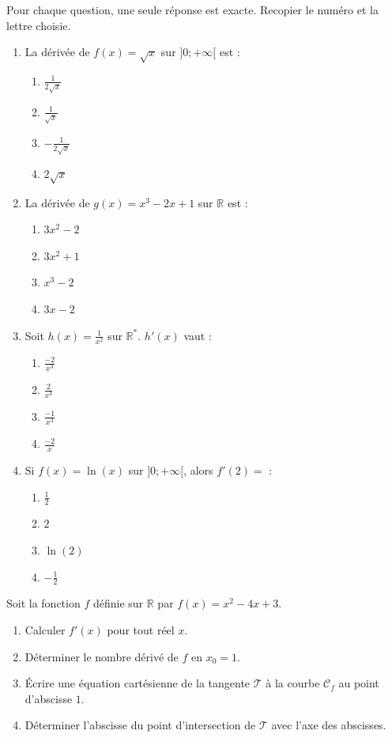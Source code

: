 \documentclass[11pt]{article}
\begin{document}
\begin{exercice}
Pour chaque question, une seule réponse est exacte. Recopier le numéro et la lettre choisie.
\begin{enumerate}
    \item La dérivée de $f(x) = \sqrt{x}$ sur $]0;+\infty[$ est :
    \begin{enumerate}
        \item $\frac{1}{2\sqrt{x}}$ \item $\frac{1}{\sqrt{x}}$ \item $-\frac{1}{2\sqrt{x}}$ \item $2\sqrt{x}$
    \end{enumerate}
    \item La dérivée de $g(x) = x^3 - 2x + 1$ sur $\mathbb{R}$ est :
    \begin{enumerate}
        \item $3x^2 - 2$ \item $3x^2 + 1$ \item $x^3 - 2$ \item $3x - 2$
    \end{enumerate}
    \item Soit $h(x) = \frac{1}{x^2}$ sur $\mathbb{R}^*$. $h'(x)$ vaut :
    \begin{enumerate}
        \item $\frac{-2}{x^3}$ \item $\frac{2}{x^3}$ \item $\frac{-1}{x^3}$ \item $\frac{-2}{x}$
    \end{enumerate}
    \item Si $f(x) = \ln(x)$ sur $]0;+\infty[$, alors $f'(2) = $ :
    \begin{enumerate}
        \item $\frac{1}{2}$ \item $2$ \item $\ln(2)$ \item $-\frac{1}{2}$
    \end{enumerate}
\end{enumerate}
\end{exercice}

\begin{exercice}
Soit la fonction $f$ définie sur $\mathbb{R}$ par $f(x) = x^2 - 4x + 3$.
\begin{enumerate}
    \item Calculer $f'(x)$ pour tout réel $x$.
    \item Déterminer le nombre dérivé de $f$ en $x_0 = 1$.
    \item Écrire une équation cartésienne de la tangente $\mathcal{T}$ à la courbe $\mathcal{C}_f$ au point d'abscisse $1$.
    \item Déterminer l'abscisse du point d'intersection de $\mathcal{T}$ avec l'axe des abscisses.
\end{enumerate}
\end{exercice}
\end{document}
